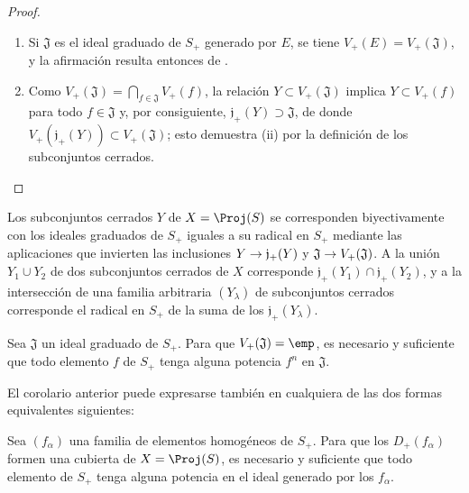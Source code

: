 \documentclass[oneside,10pt]{amsart}
\makeatletter
\newcommand{\ega@arrow}[2]{\mathchoice{#1}{#2}{#2}{#2}}
\renewcommand{\to}{\ega@arrow{\longrightarrow}{\rightarrow}}
\newcommand{\oldpage}[2][]{\marginnote{\normalfont\footnotesize\textbf{#1}~|~#2}\ignorespaces}
\let\EGAOriginalLabel\label
\renewcommand{\label}[1]{\phantomsection\EGAOriginalLabel{#1}}
\makeatother
\begin{document}
\begin{proof}
\medskip\noindent
\begin{enumerate}
  \item[\rm(i)] Si $\mathfrak{J}$ es el ideal graduado de $S_+$ generado por $E$, se tiene $V_+(E)=V_+(\mathfrak{J})$, y la afirmación resulta entonces de .
  \item[\rm(ii)] Como $V_+(\mathfrak{J})=\bigcap_{f\in\mathfrak{J}}V_+(f)$, la relación $Y\subset V_+(\mathfrak{J})$ implica $Y\subset V_+(f)$ para todo $f\in\mathfrak{J}$ y, por consiguiente, $\mathfrak{j}_+(Y)\supset\mathfrak{J}$, de donde $V_+(\mathfrak{j}_+(Y))\subset V_+(\mathfrak{J})$; esto demuestra (ii) por la definición de los subconjuntos cerrados.
\end{enumerate}
\end{proof}

\begin{corollary}[2.3.12]
\label{II.2.3.12}
Los subconjuntos cerrados $Y$ de $X=\Proj(S)$ se corresponden biyectivamente con los ideales graduados de $S_+$ iguales a su radical en $S_+$ mediante las aplicaciones que invierten las inclusiones $Y\to\mathfrak{j}_+(Y)$ y $\mathfrak{J}\to V_+(\mathfrak{J})$.
A la unión $Y_1\cup Y_2$ de dos subconjuntos cerrados de $X$ corresponde
\oldpage[II]{28}
$\mathfrak{j}_+(Y_1)\cap\mathfrak{j}_+(Y_2)$, y a la intersección de una familia arbitraria $(Y_\lambda)$ de subconjuntos cerrados corresponde el radical en $S_+$ de la suma de los $\mathfrak{j}_+(Y_\lambda)$.
\end{corollary}

\begin{corollary}[2.3.13]
\label{II.2.3.13}
Sea $\mathfrak{J}$ un ideal graduado de $S_+$.
Para que $V_+(\mathfrak{J})=\emp$, es necesario y suficiente que todo elemento $f$ de $S_+$ tenga alguna potencia $f^n$ en $\mathfrak{J}$.
\end{corollary}

El corolario anterior puede expresarse también en cualquiera de las dos formas equivalentes siguientes:

\begin{corollary}[2.3.14]
Sea $(f_\alpha)$ una familia de elementos homogéneos de $S_+$.
Para que los $D_+(f_\alpha)$ formen una cubierta de $X=\Proj(S)$, es necesario y suficiente que todo elemento de $S_+$ tenga alguna potencia en el ideal generado por los $f_\alpha$.
\label{II.2.3.14}
\end{corollary}
\end{document}
